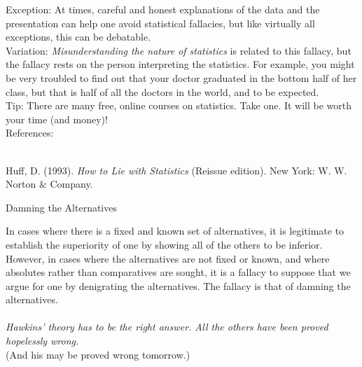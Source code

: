 \documentclass[a4paper,12pt,single,pdftex]{scrartcl}
\begin{document}
    
      Exception: At times, careful and honest explanations of the data and the presentation can help one avoid statistical fallacies, but like virtually all exceptions, this can be debatable.
    \\

    
      Variation: {\it Misunderstanding the nature of statistics} is related to this fallacy, but the fallacy rests on the person interpreting the statistics.  For example, you might be very troubled to find out that your doctor graduated in the bottom half of her class, but that is half of all the doctors in the world, and to be expected.
    \\

    
      Tip: There are many free, online courses on statistics. Take one. It will be worth your time (and money)!
    \\

    References:

    
      
        
      \\

      
        
          Huff, D. (1993). {\it How to Lie with Statistics} (Reissue edition). New York: W. W. Norton \& Company.
        
      
    
  

Damning the Alternatives
    
      In cases where there is a fixed and known set of alternatives, it is legitimate to establish the superiority of one by showing all of the others to be inferior. However, in cases where the alternatives are not fixed or known, and where absolutes rather than comparatives are sought, it is a fallacy to suppose that we argue for one by denigrating the alternatives. The fallacy is that of damning the alternatives.
    \\

    
       
    \\

    
      {\em Hawkins’ theory has to be the right answer. All the others have been proved hopelessly wrong.}
    \\

    
      (And his may be proved wrong tomorrow.)
    \\

    
       
    \\
\end{document}
